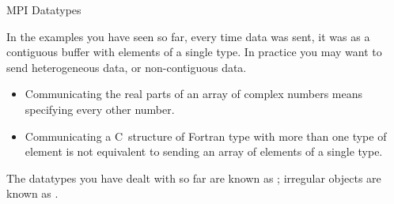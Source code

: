 
 {MPI Datatypes}


In the examples you have seen so far, every time data was sent,
it was as a contiguous buffer with elements of a single type.
In practice you may want to send heterogeneous data, or
non-contiguous data.
\begin{itemize}
\item Communicating the real parts of an array of complex numbers
  means specifying every other number.
\item Communicating a C~structure of Fortran type with more than one
  type of element is not equivalent to sending an array of elements of
  a single type.
\end{itemize}
The datatypes you have dealt with so far are known as
; irregular objects
are known as .








